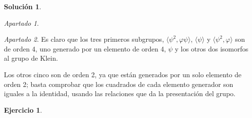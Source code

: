 \documentclass[a4paper, 11pt]{article}
\theoremstyle{definition}
\newtheorem{ejercicio}{Ejercicio}
\newtheorem*{solucion}{Solución}
\theoremstyle{remark}
\newtheorem{apartado}{Apartado}[ejercicio]
\begin{document}
\begin{solucion}
\begin{apartado}

      \end{apartado}

      \begin{apartado}
          Es claro que los tres primeros subgrupos, $\langle\psi^2,\varphi\psi\rangle$, $\langle\psi\rangle$ y $\langle\psi^2,\varphi\rangle$ son de orden 4, uno generado por un elemento de orden 4, $\psi$ y los otros dos isomorfos al grupo de Klein.

          Los otros cinco son de orden 2, ya que están generados por un solo elemento de orden 2; basta comprobar que los cuadrados de cada elemento generador son iguales a la identidad, usando las relaciones que da la presentación del grupo.
      \end{apartado}
  \end{solucion}

  \begin{ejercicio}
  \end{ejercicio}
\end{document}
